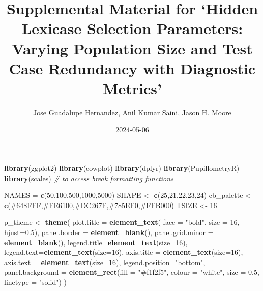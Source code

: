\documentclass[
]{book}
\title{Supplemental Material for `Hidden Lexicase Selection Parameters: Varying Population Size and Test Case Redundancy with Diagnostic Metrics'}
\author{Jose Guadalupe Hernandez, Anil Kumar Saini, Jason H. Moore}
\date{2024-05-06}
\newenvironment{Shaded}{\begin{snugshade}}{\end{snugshade}}
\newcommand{\AttributeTok}[1]{\textcolor[rgb]{0.13,0.29,0.53}{#1}}
\newcommand{\CommentTok}[1]{\textcolor[rgb]{0.56,0.35,0.01}{\textit{#1}}}
\newcommand{\DecValTok}[1]{\textcolor[rgb]{0.00,0.00,0.81}{#1}}
\newcommand{\FloatTok}[1]{\textcolor[rgb]{0.00,0.00,0.81}{#1}}
\newcommand{\FunctionTok}[1]{\textcolor[rgb]{0.13,0.29,0.53}{\textbf{#1}}}
\newcommand{\NormalTok}[1]{#1}
\newcommand{\OtherTok}[1]{\textcolor[rgb]{0.56,0.35,0.01}{#1}}
\newcommand{\StringTok}[1]{\textcolor[rgb]{0.31,0.60,0.02}{#1}}
\begin{document}
\maketitle

{
\setcounter{tocdepth}{1}
\tableofcontents
}
\begin{Shaded}
\begin{Highlighting}[]
\FunctionTok{library}\NormalTok{(ggplot2)}
\FunctionTok{library}\NormalTok{(cowplot)}
\FunctionTok{library}\NormalTok{(dplyr)}
\FunctionTok{library}\NormalTok{(PupillometryR)}
\FunctionTok{library}\NormalTok{(scales) }\CommentTok{\# to access break formatting functions}


\NormalTok{NAMES }\OtherTok{=} \FunctionTok{c}\NormalTok{(}\DecValTok{50}\NormalTok{,}\DecValTok{100}\NormalTok{,}\DecValTok{500}\NormalTok{,}\DecValTok{1000}\NormalTok{,}\DecValTok{5000}\NormalTok{)}
\NormalTok{SHAPE }\OtherTok{\textless{}{-}} \FunctionTok{c}\NormalTok{(}\DecValTok{25}\NormalTok{,}\DecValTok{21}\NormalTok{,}\DecValTok{22}\NormalTok{,}\DecValTok{23}\NormalTok{,}\DecValTok{24}\NormalTok{)}
\NormalTok{cb\_palette }\OtherTok{\textless{}{-}} \FunctionTok{c}\NormalTok{(}\StringTok{\textquotesingle{}\#648FFF\textquotesingle{}}\NormalTok{,}\StringTok{\textquotesingle{}\#FE6100\textquotesingle{}}\NormalTok{,}\StringTok{\textquotesingle{}\#DC267F\textquotesingle{}}\NormalTok{,}\StringTok{\textquotesingle{}\#785EF0\textquotesingle{}}\NormalTok{,}\StringTok{\textquotesingle{}\#FFB000\textquotesingle{}}\NormalTok{)}
\NormalTok{TSIZE }\OtherTok{\textless{}{-}} \DecValTok{16}

\NormalTok{p\_theme }\OtherTok{\textless{}{-}} \FunctionTok{theme}\NormalTok{(}
  \AttributeTok{plot.title =} \FunctionTok{element\_text}\NormalTok{( }\AttributeTok{face =} \StringTok{"bold"}\NormalTok{, }\AttributeTok{size =} \DecValTok{16}\NormalTok{, }\AttributeTok{hjust=}\FloatTok{0.5}\NormalTok{),}
  \AttributeTok{panel.border =} \FunctionTok{element\_blank}\NormalTok{(),}
  \AttributeTok{panel.grid.minor =} \FunctionTok{element\_blank}\NormalTok{(),}
  \AttributeTok{legend.title=}\FunctionTok{element\_text}\NormalTok{(}\AttributeTok{size=}\DecValTok{16}\NormalTok{),}
  \AttributeTok{legend.text=}\FunctionTok{element\_text}\NormalTok{(}\AttributeTok{size=}\DecValTok{16}\NormalTok{),}
  \AttributeTok{axis.title =} \FunctionTok{element\_text}\NormalTok{(}\AttributeTok{size=}\DecValTok{16}\NormalTok{),}
  \AttributeTok{axis.text =} \FunctionTok{element\_text}\NormalTok{(}\AttributeTok{size=}\DecValTok{16}\NormalTok{),}
  \AttributeTok{legend.position=}\StringTok{"bottom"}\NormalTok{,}
  \AttributeTok{panel.background =} \FunctionTok{element\_rect}\NormalTok{(}\AttributeTok{fill =} \StringTok{"\#f1f2f5"}\NormalTok{,}
                                  \AttributeTok{colour =} \StringTok{"white"}\NormalTok{,}
                                  \AttributeTok{size =} \FloatTok{0.5}\NormalTok{, }\AttributeTok{linetype =} \StringTok{"solid"}\NormalTok{)}
\NormalTok{)}
\end{Highlighting}
\end{Shaded}
\end{document}
